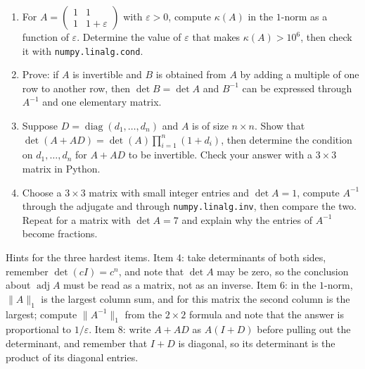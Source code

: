 \begin{latihan}
\begin{enumerate}
  \item For $A=\begin{pmatrix}1&1\\ 1&1+\varepsilon\end{pmatrix}$ with
        $\varepsilon>0$, compute $\kappa(A)$ in the $1$-norm as a function of
        $\varepsilon$. Determine the value of $\varepsilon$ that makes $\kappa(A)>10^{6}$, then
        check it with \texttt{numpy.linalg.cond}.

  \item Prove: if $A$ is invertible and $B$ is obtained from $A$ by adding a multiple of one row
        to another row, then $\det B=\det A$ and $B^{-1}$ can be expressed through $A^{-1}$ and
        one elementary matrix.

  \item Suppose $D=\operatorname{diag}(d_{1},\dots,d_{n})$ and $A$ is of size $n\times n$.
        Show that $\det(A+AD)=\det(A)\prod_{i=1}^{n}(1+d_{i})$, then determine the condition on
        $d_{1},\dots,d_{n}$ for $A+AD$ to be invertible. Check your answer with a $3\times3$
        matrix in Python.

  \item Choose a $3\times3$ matrix with small integer entries and $\det A=1$, compute $A^{-1}$
        through the adjugate and through \texttt{numpy.linalg.inv}, then compare the two. Repeat
        for a matrix with $\det A=7$ and explain why the entries of $A^{-1}$ become fractions.
\end{enumerate}

Hints for the three hardest items. Item 4: take determinants of both sides, remember
$\det(cI)=c^{n}$, and note that $\det A$ may be zero, so the conclusion about
$\operatorname{adj}A$ must be read as a matrix, not as an inverse. Item 6: in the $1$-norm,
$\lVert A\rVert_{1}$ is the largest column sum, and for this matrix the second column is the
largest; compute $\lVert A^{-1}\rVert_{1}$ from the $2\times2$ formula and note that the answer
is proportional to $1/\varepsilon$. Item 8: write $A+AD$ as $A(I+D)$ before pulling out the
determinant, and remember that $I+D$ is diagonal, so its determinant is the product of its
diagonal entries.
\end{latihan}

